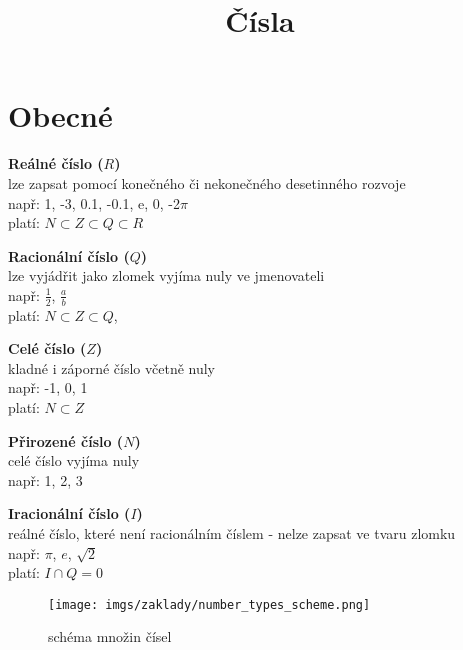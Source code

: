 \documentclass[a4paper,11pt]{article}
\title{Čísla}
\begin{document}
\maketitle

\section{Obecné}
\begin{description}
    \item{\textbf{Reálné číslo ($R$)}}\\
        lze zapsat pomocí konečného či nekonečného desetinného
        rozvoje\\
        např: 1, -3, 0.1, -0.1, e, 0, -2$\pi$\\
        platí: ${N \subset Z \subset Q \subset R}$

        \begin{description}
            \item{\textbf{Racionální číslo ($Q$)}}\\
                lze vyjádřit jako zlomek vyjíma nuly ve jmenovateli\\
                např: $\frac{1}{2}$, $\frac{a}{b}$\\
                platí: $N \subset Z \subset Q$, 

                \begin{description}
                    \item{\textbf{Celé číslo ($Z$)}}\\
                        kladné i záporné číslo včetně nuly\\
                        např: -1, 0, 1\\
                        platí: $N \subset Z$

                        \begin{description}
                            \item{\textbf{Přirozené číslo ($N$)}}\\
                                celé číslo vyjíma nuly\\
                                např: 1, 2, 3\\
                        \end{description}

                \end{description}

        \item{\textbf{Iracionální číslo ($I$)}}\\
            reálné číslo, které není racionálním číslem - nelze
            zapsat ve tvaru zlomku\\
            např: $\pi$, $e$, $\sqrt{2}$\\
            platí: $I \cap Q = 0$
        \end{description}

\end{description}
\begin{figure}[ht]
    \texttt{[image: imgs/zaklady/number\_types\_scheme.png]}
    \caption{schéma množin čísel}
\end{figure}
\end{document}
